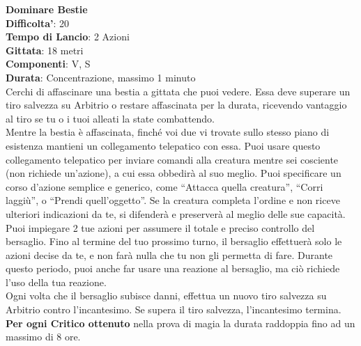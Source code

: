 \begin{multicols}{2}
\medskip\textbf{Dominare Bestie}\\
\textbf{Difficolta'}: 20\\
\textbf{Tempo di Lancio}: 2 Azioni\\
\textbf{Gittata}: 18 metri\\
\textbf{Componenti}: V, S\\
\textbf{Durata}: Concentrazione, massimo 1 minuto\\
Cerchi di affascinare una bestia a gittata che puoi vedere. Essa deve superare un tiro salvezza su Arbitrio o restare affascinata per la durata, ricevendo vantaggio al tiro se tu o i tuoi alleati la state combattendo.\\
Mentre la bestia è affascinata, finché voi due vi trovate sullo stesso piano di esistenza mantieni un collegamento telepatico con essa. Puoi usare questo collegamento telepatico per inviare comandi alla creatura mentre sei cosciente (non richiede un’azione),
a cui essa obbedirà al suo meglio. Puoi specificare un corso d’azione semplice e generico, come “Attacca quella creatura”, “Corri laggiù”, o “Prendi quell’oggetto”. Se la creatura completa l’ordine e non riceve ulteriori indicazioni da te, si difenderà e preserverà al meglio delle sue capacità.\\
Puoi impiegare 2 tue azioni per assumere il totale e preciso controllo del bersaglio. Fino al termine del tuo prossimo turno, il bersaglio effettuerà solo le azioni decise da te, e non farà nulla che tu non gli permetta di fare. Durante questo periodo, puoi anche far usare una reazione al bersaglio, ma ciò richiede l’uso della tua reazione.\\
Ogni volta che il bersaglio subisce danni, effettua un nuovo tiro salvezza su Arbitrio contro l’incantesimo. Se supera il tiro salvezza, l’incantesimo termina.\\
\textbf{Per ogni Critico ottenuto} nella prova di magia la durata raddoppia fino ad un massimo di 8 ore.


\end{multicols}
